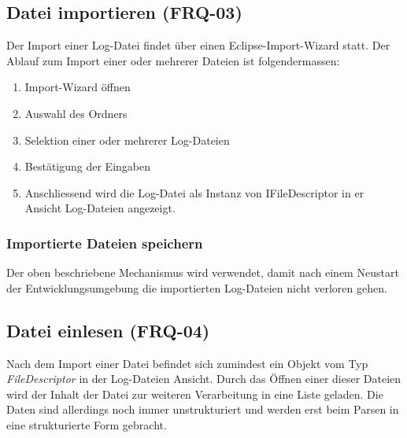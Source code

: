\subsection{Datei importieren (FRQ-03)}
Der Import einer Log-Datei findet über einen Eclipse-Import-Wizard statt. Der Ablauf zum Import einer oder mehrerer Dateien ist folgendermassen:
\begin{enumerate}
	\item Import-Wizard öffnen
	\item Auswahl des Ordners
	\item Selektion einer oder mehrerer Log-Dateien
	\item Bestätigung der Eingaben
	\item Anschliessend wird die Log-Datei als Instanz von IFileDescriptor in er Ansicht Log-Dateien angezeigt.
\end{enumerate}

\subsubsection{Importierte Dateien speichern}
Der oben beschriebene Mechanismus wird verwendet, damit nach einem Neustart der Entwicklungsumgebung die importierten Log-Dateien nicht verloren gehen. 

\subsection{Datei einlesen (FRQ-04)}
Nach dem Import einer Datei befindet sich zumindest ein Objekt vom Typ \textit{FileDescriptor} in der Log-Dateien Ansicht. Durch das Öffnen einer dieser Dateien wird der Inhalt der Datei zur weiteren Verarbeitung in eine Liste geladen. Die Daten sind allerdings noch immer unstrukturiert und werden erst beim Parsen in eine strukturierte Form gebracht.

